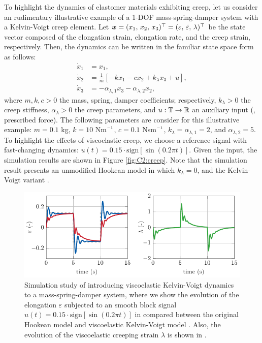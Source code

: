 \begin{example} To highlight the dynamics of elastomer materials exhibiting creep, let us consider an rudimentary illustrative example of a 1-DOF mass-spring-damper system with a Kelvin-Voigt creep element. Let ${\boldsymbol{x}} = (x_1,\,x_2,\,x_3)^\top = (\varepsilon,\, \dot{\varepsilon},\, \lambda)^\top$ be the state vector composed of the elongation strain, elongation rate, and the creep strain, respectively. Then, the dynamics can be written in the familiar state space form as follows:
%
\begin{align}
\dot{x}_1 & = x_1, \\
\dot{x}_2 & = \frac{1}{m}\left[ -k x_1 - c x_2 + k_\lambda x_3 + u \right], \\
\dot{x}_3 & = -\alpha_{\lambda,1}x_3 -\alpha_{\lambda,2}x_2,
\end{align}
%
where $m,k,c>0$  the mass, spring, damper coefficients; respectively, $k_{\lambda}>0$ the creep stiffness, $\alpha_{\lambda}>0$ the creep parameters, and $u: \mathbb{T} \to \mathbb{R}$ an auxiliary input (\ie, prescribed force). The following parameters are consider for this illustrative example: $m = 0.1$ \si{\kilo \gram}, $k = 10$ Nm$\inv$, $c = 0.1$ Nsm$\inv$, $k_{\lambda} = \alpha_{\lambda,1} = 2$, and $\alpha_{\lambda,2} = 5$.  To highlight the effects of viscoelastic creep, we choose a reference signal with fast-changing dynamics: $u(t) = 0.15\cdot \textrm{sign}\left[ \sin(0.2\pi t) \right]$. Given the input, the simulation results are shown in Figure \ref{fig:C2:creep}. Note that the simulation result presents an unmodified Hookean model  in which $k_\lambda = 0$, and the Kelvin-Voigt variant .
%
\begin{figure}[!t]
   \includegraphics*{./pdf/thesis-figure-4-10.pdf}
   \vspace{-0.2cm}
   \caption{\small Simulation study of introducing viscoelastic Kelvin-Voigt dynamics to a mass-spring-damper system, where we show the evolution of the elongation $\varepsilon$ subjected to an smooth block signal $u(t) = 0.15\cdot \textrm{sign}\left[ \sin(0.2\pi t) \right]$ in  compared between the original Hookean model  and viscoelastic Kelvin-Voigt model . Also, the evolution of the viscoelastic creeping strain $\lambda$ is shown in .}

\end{figure}
\end{example}
